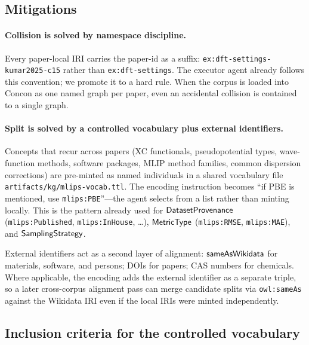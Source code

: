 \subsection{Mitigations}

\paragraph{Collision is solved by namespace discipline.}
Every paper-local IRI carries the paper-id as a suffix:
\texttt{ex:dft-settings-kumar2025-c15} rather than
\texttt{ex:dft-settings}. The executor agent already follows this
convention; we promote it to a hard rule. When the corpus is
loaded into Concon as one named graph per paper, even an accidental
collision is contained to a single graph.

\paragraph{Split is solved by a controlled vocabulary plus external
identifiers.}
Concepts that recur across papers (XC functionals, pseudopotential
types, wave-function methods, software packages, MLIP method
families, common dispersion corrections) are pre-minted as named
individuals in a shared vocabulary file
\texttt{artifacts/kg/mlips-vocab.ttl}. The encoding instruction
becomes ``if PBE is mentioned, use \texttt{mlips:PBE}''---the agent
selects from a list rather than minting locally. This is the
pattern already used for $\mathsf{DatasetProvenance}$
(\texttt{mlips:Published}, \texttt{mlips:InHouse}, \dots),
$\mathsf{MetricType}$ (\texttt{mlips:RMSE}, \texttt{mlips:MAE}), and
$\mathsf{SamplingStrategy}$.

External identifiers act as a second layer of alignment:
$\mathsf{sameAsWikidata}$ for materials, software, and persons;
DOIs for papers; CAS numbers for chemicals. Where applicable, the
encoding adds the external identifier as a separate triple, so a
later cross-corpus alignment pass can merge candidate splits via
\texttt{owl:sameAs} against the Wikidata IRI even if the local
IRIs were minted independently.

\subsection{Inclusion criteria for the controlled vocabulary}

